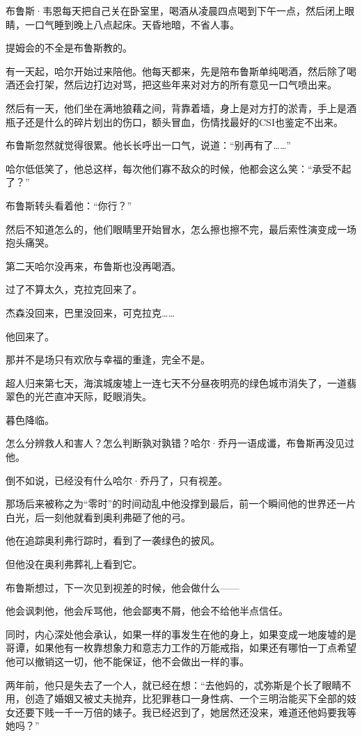 \documentclass[../main]{subfiles}
\begin{document}
布鲁斯·韦恩每天把自己关在卧室里，喝酒从凌晨四点喝到下午一点，然后闭上眼睛，一口气睡到晚上八点起床。天昏地暗，不省人事。

提姆会的不全是布鲁斯教的。

有一天起，哈尔开始过来陪他。他每天都来，先是陪布鲁斯单纯喝酒，然后除了喝酒还会打架，然后边打边对骂，把这些年来对对方的所有意见一口气喷出来。

然后有一天，他们坐在满地狼藉之间，背靠着墙，身上是对方打的淤青，手上是酒瓶子还是什么的碎片划出的伤口，额头冒血，伤情找最好的CSI也鉴定不出来。

布鲁斯忽然就觉得很累。他长长呼出一口气，说道：“别再有了\ldots\ldots”

哈尔低低笑了，他总这样，每次他们寡不敌众的时候，他都会这么笑：“承受不起了？”

布鲁斯转头看着他：“你行？”

然后不知道怎么的，他们眼睛里开始冒水，怎么擦也擦不完，最后索性演变成一场抱头痛哭。

第二天哈尔没再来，布鲁斯也没再喝酒。

过了不算太久，克拉克回来了。

杰森没回来，巴里没回来，可克拉克……

他回来了。

那并不是场只有欢欣与幸福的重逢，完全不是。

超人归来第七天，海滨城废墟上一连七天不分昼夜明亮的绿色城市消失了，一道翡翠色的光芒直冲天际，眨眼消失。

暮色降临。

怎么分辨救人和害人？怎么判断孰对孰错？哈尔·乔丹一语成谶，布鲁斯再没见过他。

倒不如说，已经没有什么哈尔·乔丹了，只有视差。

那场后来被称之为“零时”的时间动乱中他没撑到最后，前一个瞬间他的世界还一片白光，后一刻他就看到奥利弗砸了他的弓。

他在追踪奥利弗行踪时，看到了一袭绿色的披风。

但他没在奥利弗葬礼上看到它。

布鲁斯想过，下一次见到视差的时候，他会做什么——

他会讽刺他，他会斥骂他，他会鄙夷不屑，他会不给他半点信任。

同时，内心深处他会承认，如果一样的事发生在他的身上，如果变成一地废墟的是哥谭，如果他有一枚靠想象力和意志力工作的万能戒指，如果还有哪怕一丁点希望他可以撤销这一切，他不能保证，他不会做出一样的事。

两年前，他只是失去了一个人，就已经在想：“去他妈的，忒弥斯是个长了眼睛不用，创造了婚姻又被丈夫抛弃，比犯罪巷口一身性病、一个三明治能买下全部的妓女还要下贱一千一万倍的婊子。我已经迟到了，她居然还没来，难道还他妈要我等她吗？”
\end{document}
